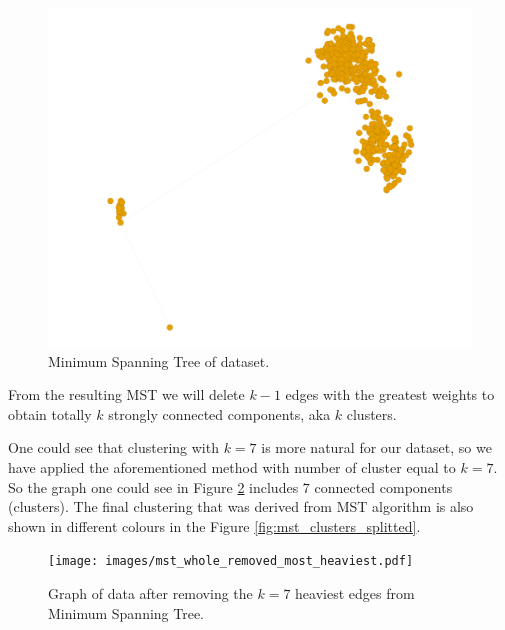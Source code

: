 {{\begin{figure}[h]
	\centering
	\begin{minipage}[h]{0.8\linewidth}
\includegraphics[width=\linewidth]{images/mst_whole.pdf}
	\end{minipage}	
	\caption{Minimum Spanning Tree of dataset.}
	\label{fig:mst_whole}	
\end{figure}	
	
	From the resulting MST we will delete $k-1$ edges with the greatest weights to obtain totally $k$ strongly connected components, aka  $k$ clusters. 
	
	One could see that  clustering with $k=7$ is more natural for our dataset, so we have  applied the aforementioned  method with number of cluster equal to  $k = 7$. So the graph one could see in Figure \ref{fig:mst_whole_removed_heaviest}  includes $7$ connected components (clusters).  The final clustering that was derived from MST algorithm is also shown in different colours in the Figure \ref{fig:mst_clusters_splitted}.

\begin{figure}[h]
	\centering
	\begin{minipage}[h]{0.8\linewidth}
\texttt{[image: images/mst\_whole\_removed\_most\_heaviest.pdf]}
	\end{minipage}
	\caption{Graph of data after removing the $k=7$ heaviest edges from Minimum Spanning Tree.}
	\label{fig:mst_whole_removed_heaviest}	
\end{figure}	

}}

